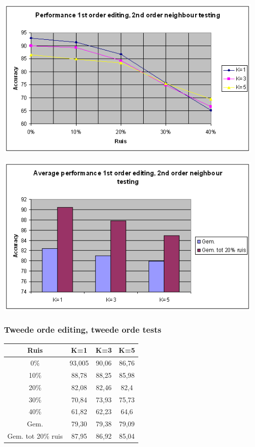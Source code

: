 \documentclass{article}
\begin{document}
\begin{center} \includegraphics[scale=0.7]{xor_1stordedit_2ndordtest_lijn} \end{center}
\begin{center} \includegraphics[scale=0.7]{xor_1stordedit_2ndordtest_staaf} \end{center}

\subsubsection{Tweede orde editing, tweede orde tests}

\begin{tabular}{|c|c|c|c|} \hline
Ruis &	K=1 &	K=3 &	K=5 \\ \hline
0\%	& 93,005 &	90,06 &	86,76 \\
10\%	 & 88,78 &	88,25 &	85,98 \\
20\%	 & 82,08 &	82,46 &	82,4 \\
30\%	 & 70,84 &	73,93 &	75,73 \\
40\%	 & 61,82 &	62,23 &	64,6 \\
Gem.	 & 79,30 &	79,38 &	79,09 \\
Gem. tot 20\% ruis &	87,95 &	86,92 &	85,04 \\ \hline
\end{tabular} \\
\end{document}
